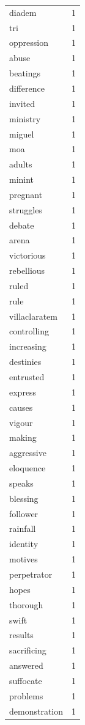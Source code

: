 \begin{tabular}{lr}
diadem & 1 \\
tri & 1 \\
oppression & 1 \\
abuse & 1 \\
beatings & 1 \\
difference & 1 \\
invited & 1 \\
ministry & 1 \\
miguel & 1 \\
moa & 1 \\
adults & 1 \\
minint & 1 \\
pregnant & 1 \\
struggles & 1 \\
debate & 1 \\
arena & 1 \\
victorious & 1 \\
rebellious & 1 \\
ruled & 1 \\
rule & 1 \\
villaclaratem & 1 \\
controlling & 1 \\
increasing & 1 \\
destinies & 1 \\
entrusted & 1 \\
express & 1 \\
causes & 1 \\
vigour & 1 \\
making & 1 \\
aggressive & 1 \\
eloquence & 1 \\
speaks & 1 \\
blessing & 1 \\
follower & 1 \\
rainfall & 1 \\
identity & 1 \\
motives & 1 \\
perpetrator & 1 \\
hopes & 1 \\
thorough & 1 \\
swift & 1 \\
results & 1 \\
sacrificing & 1 \\
answered & 1 \\
suffocate & 1 \\
problems & 1 \\
demonstration & 1 \\

\end{tabular}
